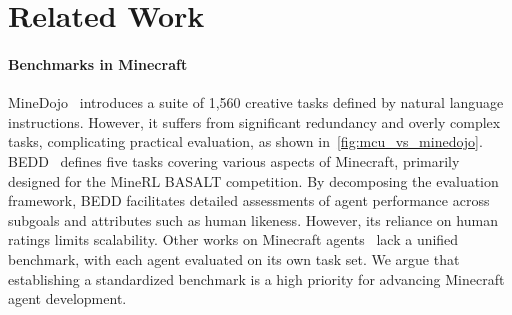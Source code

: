 \section{Related Work}
\label{sec:related_work}
 
\paragraph{Benchmarks in Minecraft} 
MineDojo~\citep{minedojo} introduces a suite of 1,560 creative tasks defined by natural language instructions. However, it suffers from significant redundancy and overly complex tasks, complicating practical evaluation, as shown in~\cref{fig:mcu_vs_minedojo}. BEDD~\citep{milani2023bedd} defines five tasks covering various aspects of Minecraft, primarily designed for the MineRL BASALT competition. By decomposing the evaluation framework, BEDD facilitates detailed assessments of agent performance across subgoals and attributes such as human likeness. However, its reliance on human ratings limits scalability. Other works on Minecraft agents~\citep{deps,jarvis1,groot,plan4mc,vpt,steve1} lack a unified benchmark, with each agent evaluated on its own task set. We argue that establishing a standardized benchmark is a high priority for advancing Minecraft agent development.

